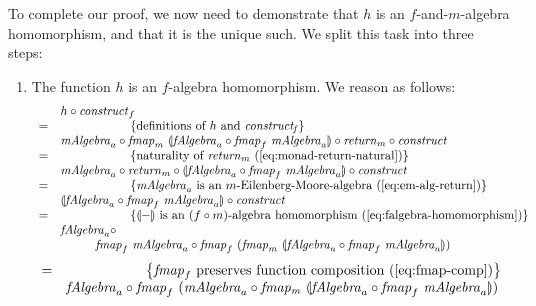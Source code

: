 \documentclass{jfp1}
\newcommand{\fold}[1]{\llparenthesis #1 \rrparenthesis}
\newcommand{\eqAnnotation}[1]{\hspace{2cm}\left\{\textrm{#1}\right\}}
\begin{document}
\begin{proof*}
  To complete our proof, we now need to demonstrate that $h$ is an
  $f$-and-$m$-algebra homomorphism, and that it is the unique such. We
  split this task into three steps:
  \begin{enumerate}
  \item The function $h$ is an $f$-algebra homomorphism. We reason as
    follows:
    \begin{displaymath}
      \begin{array}{cl}
        & h \circ \mathit{construct}_f \\
        =&\eqAnnotation{definitions of $h$ and $\mathit{construct_f}$} \\
         &\mathit{mAlgebra}_a \circ \mathit{fmap}_m~\fold{\mathit{fAlgebra}_a \circ \mathit{fmap}_f~\mathit{mAlgebra}_a} \circ \mathit{return}_m \circ \mathit{construct} \\
        =&\eqAnnotation{naturality of $\mathit{return}_m$ (\autoref{eq:monad-return-natural})} \\
         &\mathit{mAlgebra}_a \circ \mathit{return}_m \circ \fold{\mathit{fAlgebra}_a \circ \mathit{fmap}_f~\mathit{mAlgebra}_a} \circ \mathit{construct} \\
        =&\eqAnnotation{$\mathit{mAlgebra}_a$ is an $m$-Eilenberg-Moore-algebra (\autoref{eq:em-alg-return})} \\
         &\fold{\mathit{fAlgebra}_a \circ \mathit{fmap}_f~\mathit{mAlgebra}_a} \circ \mathit{construct} \\
        =&\eqAnnotation{$\fold{-}$ is an $(f \circ m)$-algebra homomorphism (\autoref{eq:falgebra-homomorphism})} \\
         &\mathit{fAlgebra}_a \circ \\
         & \hspace{1cm}\mathit{fmap}_f~\mathit{mAlgebra}_a \circ \mathit{fmap}_f~(\mathit{fmap}_m~\fold{\mathit{fAlgebra}_a \circ \mathit{fmap}_f~\mathit{mAlgebra}_a}) \\
    \end{array}
  \end{displaymath}
  \begin{displaymath}
    \begin{array}{cl}
        =&\eqAnnotation{$\mathit{fmap}_f$ preserves function composition (\autoref{eq:fmap-comp})} \\
         &\mathit{fAlgebra}_a \circ \mathit{fmap}_f~(\mathit{mAlgebra}_a \circ \mathit{fmap_m}~\fold{\mathit{fAlgebra}_a \circ \mathit{fmap}_f~\mathit{mAlgebra}_a}) \\

\end{array}
\end{displaymath}
\end{enumerate}
\end{proof*}
\end{document}
